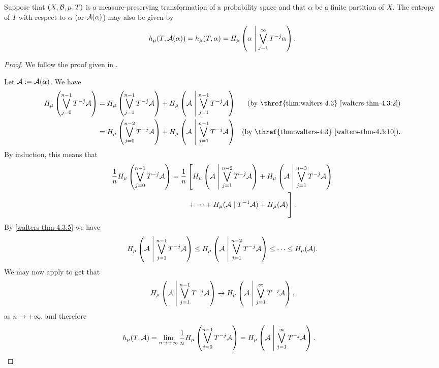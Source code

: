 \begin{theorem}
	Suppose that $(X, \mathcal{B}, \mu, T)$ is a measure-preserving transformation of a probability space and that $\alpha$ be a finite partition of $X$. The entropy of $T$ with respect to $\alpha$ (or $\mathcal{A}(\alpha)$) may also be given by
	\[
		h_\mu(T, \mathcal{A}(\alpha)) = h_\mu(T, \alpha) = H_\mu\left(\alpha \mathrel{}\middle|\mathrel{} \bigvee_{j = 1}^\infty {T^{-j}{\alpha}}\right).
	\]
	
	\begin{proof}
		We follow the proof given in \cite[Lecture 24]{ergodic-lectures}.
		
		Let $\mathcal{A} := \mathcal{A}(\alpha)$. We have
		\begin{align*}
			H_\mu\left(\bigjoin_{j = 0}^{n - 1}{T^{-j}{\A}}\right) &= H_\mu\left(\bigjoin_{j = 1}^{n - 1}{T^{-j}{\A}}\right) + H_\mu\left(\A \midmid \bigjoin_{j = 1}^{n - 1}{T^{-j}{\A}}\right) & \text{(by \thref{thm:walters-4.3} \ref{walters-thm-4.3:2})} \\
				&= H_\mu\left(\bigjoin_{j = 0}^{n - 2}{T^{-j}{\A}}\right) + H_\mu\left(\A \midmid \bigjoin_{j = 1}^{n - 1}{T^{-j}{\A}}\right) & \text{(by \thref{thm:walters-4.3} \ref{walters-thm-4.3:10})}.
		\end{align*}
		By induction, this means that
		\begin{align*}
			\frac{1}{n} H_\mu\left(\bigjoin_{j = 0}^{n - 1}{T^{-j}{\A}}\right) &= \frac{1}{n}\left[H_\mu\left(\A \midmid \bigjoin_{j = 1}^{n - 2}{T^{-j}{\A}}\right) + H_\mu\left(\A \midmid \bigjoin_{j = 1}^{n - 3}{T^{-j}{\A}}\right)\right. \\
				& \left. \vphantom{\bigjoin_{j = 1}^{n - 2}{T^{-j}{\A}}} \qquad + \dots + H_\mu(\A \mid T^{-1}{\A}) + H_\mu(\A)\right].
		\end{align*}
		By  \ref{walters-thm-4.3:5} we have
		\[
			H_\mu\left(\mathcal{A} \mathrel{}\middle|\mathrel{} \bigvee_{j = 1}^{n - 1}{T^{-j}{\mathcal{A}}}\right) \leq H_\mu\left(\mathcal{A} \mathrel{}\middle|\mathrel{} \bigvee_{j = 1}^{n - 2}{T^{-j}{\mathcal{A}}}\right) \leq \dots \leq H_\mu(\mathcal{A}).
		\]
		We may now apply  to get that
		\[
			H_\mu\left(\mathcal{A} \mathrel{}\middle|\mathrel{} \bigvee_{j = 1}^{n - 1}{T^{-j}{\mathcal{A}}}\right) \to H_\mu\left(\mathcal{A} \mathrel{}\middle|\mathrel{} \bigvee_{j = 1}^\infty{T^{-j}{\mathcal{A}}}\right),
		\]
		as $n \to +\infty$, and therefore
		\begin{align*}
			h_\mu(T, \mathcal{A}) = \lim_{n \to +\infty}{\frac{1}{n} H_\mu\left(\bigvee_{j = 0}^{n - 1}{}T^{-j}{\mathcal{A}}\right)} &= H_\mu\left(\mathcal{A} \mathrel{}\middle|\mathrel{} \bigvee_{j = 1}^\infty{T^{-j}{\mathcal{A}}}\right).
		\end{align*}
	\end{proof}
\end{theorem}

